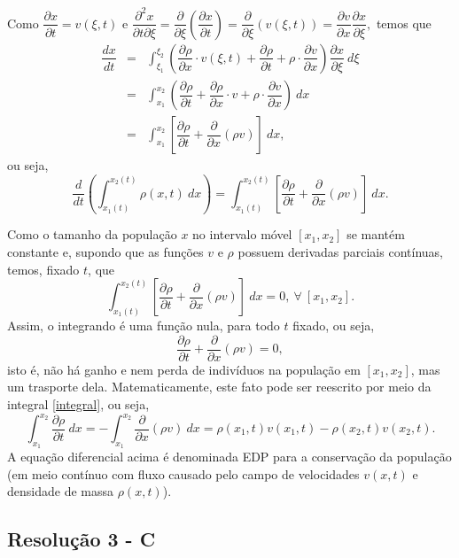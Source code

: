 Como $\dfrac{\partial x}{\partial t} = v(\xi, t)$ e
$
\dfrac{\partial^2 x}{\partial t \partial \xi} = \dfrac{\partial}{\partial \xi} \left(\dfrac{\partial x}{\partial t}\right) = \dfrac{\partial}{\partial \xi} (v(\xi, t)) = \dfrac{\partial v}{\partial x}\dfrac{\partial x}{\partial \xi},
$
temos que
\begin{eqnarray}
\dfrac{dx}{dt} 
&=&
\displaystyle \int_{\xi_1}^{\xi_2} \left( \dfrac{\partial \rho}{\partial x}\cdot v(\xi, t) + \dfrac{\partial \rho}{\partial t} + \rho \cdot \dfrac{\partial v}{\partial x} \right)\dfrac{\partial x}{\partial \xi}\ d \xi \nonumber \\
&=&
\displaystyle \int_{x_1}^{x_2} \left( \dfrac{\partial \rho}{\partial t} + \dfrac{\partial \rho}{\partial x}\cdot v + \rho \cdot \dfrac{\partial v}{\partial x} \right)\ dx \nonumber \\
&=&
\displaystyle \int_{x_1}^{x_2} \left[\dfrac{\partial \rho}{\partial t} + \dfrac{\partial}{\partial x}(\rho v) \right]\ dx,  \label{integral}
\end{eqnarray}
ou seja,
$$
\dfrac{d}{dt}\left(\displaystyle\int_{x_1(t)}^{x_2(t)} \rho(x,t)\ dx \right) = \displaystyle \int_{x_1(t)}^{x_2(t)} \left[ \dfrac{\partial \rho}{\partial t} + \dfrac{\partial}{\partial x}(\rho v) \right]\ dx.
$$

Como o tamanho da população $x$ no intervalo móvel \([x_1, x_2]\) se mantém constante e, supondo que as funções $v$ e $\rho$ possuem derivadas parciais contínuas, temos, fixado $t$, que
$$
\displaystyle \int_{x_1(t)}^{x_2(t)} \left[\dfrac{\partial \rho}{\partial t} + \dfrac{\partial}{\partial x}(\rho v) \right]\ dx = 0,\ \forall\ [x_1, x_2].
$$
Assim, o integrando é uma função nula, para todo $t$ fixado, ou seja,
$$
\dfrac{\partial \rho}{\partial t} + \dfrac{\partial}{\partial x}(\rho v) = 0,
$$
isto é, não há ganho e nem perda de indivíduos na população em $[x_1, x_2]$, mas um trasporte dela. Matematicamente, este fato pode ser reescrito por meio da integral \eqref{integral}, ou seja, 
$$
\displaystyle \int_{x_1}^{x_2} \dfrac{\partial \rho}{\partial t}\ dx = - \displaystyle \int_{x_1}^{x_2} \dfrac{\partial}{\partial x}(\rho v)\ dx = \rho(x_1,t) v(x_1,t) - \rho(x_2,t) v(x_2,t). 
$$
A equação diferencial acima é denominada EDP para a conservação da população (em meio contínuo com fluxo causado pelo campo de velocidades $v(x,t)$ e densidade de massa $\rho(x,t)$).


\subsection*{\blue Resolução 3 - \textbf{C}}


